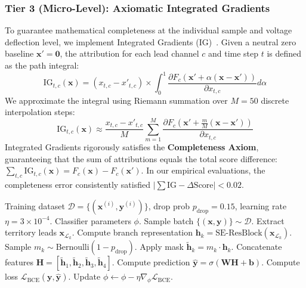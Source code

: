 \documentclass[12pt]{elsarticle}
\begin{document}
\subsubsection{Tier 3 (Micro-Level): Axiomatic Integrated Gradients}
To guarantee mathematical completeness at the individual sample and voltage deflection level, we implement Integrated Gradients (IG)~\cite{sundararajan2017axiomatic}. Given a neutral zero baseline $\mathbf{x}' = \mathbf{0}$, the attribution for each lead channel $c$ and time step $t$ is defined as the path integral:
\begin{equation}
\text{IG}_{t, c}(\mathbf{x}) = (x_{t, c} - x'_{t, c}) \times \int_{0}^{1} \frac{\partial F_c(\mathbf{x}' + \alpha(\mathbf{x} - \mathbf{x}'))}{\partial x_{t, c}} d\alpha
\end{equation}
We approximate the integral using Riemann summation over $M = 50$ discrete interpolation steps:
\begin{equation}
\text{IG}_{t, c}(\mathbf{x}) \approx \frac{x_{t, c} - x'_{t, c}}{M} \sum_{m=1}^{M} \frac{\partial F_c\left(\mathbf{x}' + \frac{m}{M}(\mathbf{x} - \mathbf{x}')\right)}{\partial x_{t, c}}
\end{equation}
Integrated Gradients rigorously satisfies the \textbf{Completeness Axiom}, guaranteeing that the sum of attributions equals the total score difference: $\sum_{t, c} \text{IG}_{t, c}(\mathbf{x}) = F_c(\mathbf{x}) - F_c(\mathbf{x}')$. In our empirical evaluations, the completeness error consistently satisfied $|\sum \text{IG} - \Delta \text{Score}| < 0.02$.

\begin{algorithm}[t]
\caption{Anatomical Territory-Dropout Classifier Training}
\label{alg:classifier_training}
\begin{algorithmic}[1]
\REQUIRE Training dataset $\mathcal{D} = \{(\mathbf{x}^{(i)}, \mathbf{y}^{(i)})\}$, drop prob $p_{\text{drop}} = 0.15$, learning rate $\eta = 3\times 10^{-4}$.
\ENSURE Classifier parameters $\phi$.
    \STATE Sample batch $\{(\mathbf{x}, \mathbf{y})\} \sim \mathcal{D}$.
        \STATE Extract territory leads $\mathbf{x}_{\mathcal{L}_k}$.
        \STATE Compute branch representation $\mathbf{h}_k = \text{SE-ResBlock}(\mathbf{x}_{\mathcal{L}_k})$.
        \STATE Sample $m_k \sim \text{Bernoulli}(1 - p_{\text{drop}})$.
        \STATE Apply mask $\tilde{\mathbf{h}}_k = m_k \cdot \mathbf{h}_k$.
    \ENDFOR
    \STATE Concatenate features $\mathbf{H} = [\tilde{\mathbf{h}}_1, \tilde{\mathbf{h}}_2, \tilde{\mathbf{h}}_3, \tilde{\mathbf{h}}_4]$.
    \STATE Compute prediction $\hat{\mathbf{y}} = \sigma(\mathbf{W} \mathbf{H} + \mathbf{b})$.
    \STATE Compute loss $\mathcal{L}_{\text{BCE}}(\mathbf{y}, \hat{\mathbf{y}})$.
    \STATE Update $\phi \leftarrow \phi - \eta \nabla_\phi \mathcal{L}_{\text{BCE}}$.
\ENDWHILE
\end{algorithmic}
\end{algorithm}
\end{document}
